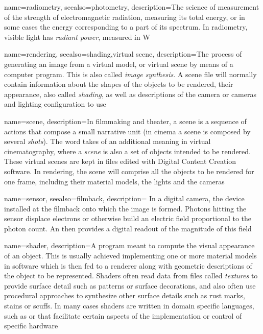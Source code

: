 {
	name={radiometry},
	seealso={photometry},
	description={The science of measurement of the strength of electromagnetic radiation,
		measuring its total energy, or in some cases the energy corresponding to a part of
		its spectrum. In radiometry, visible light has \textsl{radiant power},
		measured in \unit{\watt}}
}

{
	name={rendering},
	seealso={shading,virtual scene},
	description={The process of generating an image from a virtual model, or virtual scene by 
		means of a computer program. This is also called \textsl{image synthesis}. A scene file
		will normally contain information about the shapes of the objects to be rendered, their
		appearance, also called \textsl{shading}, as well as descriptions of the camera or cameras and lighting configuration
		to use}
}

{
    name={scene},
	description={In filmmaking and theater, a scene is a sequence of actions that compose
		a small narrative unit (in cinema a scene is composed by several 
		\textsl{shots}). 
		The word takes of an additional meaning in virtual cinematography, 
		where a \textsl{scene} is also a set of objects intended to be rendered.
		These virtual scenes are kept in files edited with 
		Digital Content Creation software.
		In rendering, the scene will comprise all the objects to be rendered for one frame,
		including their material models, the lights and the cameras}
}

{
	name=sensor,
	seealso={filmback},
	description={
		In a digital camera, the device installed at the filmback onto which the image is 
		formed. Photons hitting the sensor displace electrons or otherwise build an electric
		field proportional to the photon count. An  then provides a 
		digital readout of the magnitude of this field}
}

{
	name={shader},
	description={A program meant to compute the visual appearance of an object. 
		This is usually achieved implementing one or more material models in 
		software which is then fed to a renderer along with geometric descriptions
		of the object to be represented.
		Shaders often read data from files called \textsl{textures} to provide 
		surface detail such as patterns or surface decorations, 
		and also often use procedural approaches to synthesize other surface
		details such as rust marks, stains or scuffs.
		In many cases shaders are written in domain specific languages, such as 
		 or  that facilitate certain aspects of the 
		implementation or control of specific hardware}
}

